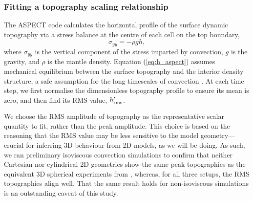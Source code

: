 \documentclass[trackchanges]{aastex63}
\newcommand{\jr}[1]{\textit{\textcolor{blue}{{#1}}}}
\begin{document}
\subsubsection{Fitting a topography scaling relationship} \label{sec:methods-hscaling}

The ASPECT code calculates the horizontal profile of the surface dynamic topography via a stress balance at the centre of each cell on the top boundary,
\begin{equation} \label{eq:h_aspect}
    \sigma_{yy} = - \rho g h,
\end{equation} 
where $\sigma_{yy}$ is the vertical component of the stress imparted by convection, $g$ is the gravity, and $\rho$ is the mantle density. Equation (\ref{eq:h_aspect}) assumes mechanical equilibrium between the surface topography and the interior density structure, a safe assumption for the long timescales of convection \citep[e.g.,][]{ricard_physics_2015}. At each time step, we first normalise the dimensionless topography profile to ensure its mean is zero, and then find its RMS value, $h_{\rm rms}^\prime$. 

We choose the RMS amplitude of topography as the representative scalar quantity to fit, rather than the peak amplitude. This choice is based on the reasoning that the RMS value may be less sensitive to the model geometry---crucial for inferring 3D behaviour from 2D models, as we will be doing. As such, we ran preliminary isoviscous convection simulations to confirm that neither Cartesian nor cylindrical 2D geometries show the same peak topographies as the equivalent 3D spherical experiments from \citet{lees_gravity_2020}, whereas, for all three setups, the RMS topographies align well. That the same result holds for non-isoviscous simulations is an outstanding caveat of this study.


\end{document}
